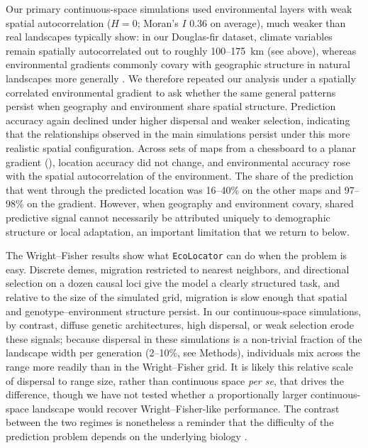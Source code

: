 \documentclass[]{article}
\newcommand{\dfir}{Douglas-fir\xspace}
\newcommand{\ecolocator}{\texttt{EcoLocator}\xspace}
\begin{document}
Our primary continuous-space simulations used environmental layers
with weak spatial autocorrelation
($H=0$; Moran's $I$ 0.36 on average),
much weaker than real landscapes typically show: in our \dfir dataset, climate variables remain spatially
autocorrelated out to roughly 100--175~km (see above), whereas environmental
gradients commonly covary with geographic structure in natural landscapes
more generally \citep{meirmans_ibd_2012}.
We therefore repeated our analysis under a spatially correlated
environmental gradient to ask whether the same general patterns
persist when geography and environment share spatial structure.
Prediction accuracy again declined under higher dispersal
and weaker selection, indicating that the relationships observed
in the main simulations persist under this more realistic
spatial configuration.
Across sets of maps from a chessboard to a planar gradient
(),
location accuracy did not change,
and environmental accuracy rose with the spatial autocorrelation
of the environment.
The share of the prediction that went through the predicted location
was 16--40\% on the other maps and 97--98\% on the gradient.
However, when geography and environment covary,
shared predictive signal cannot necessarily be attributed uniquely
to demographic structure or local adaptation,
an important limitation that we return to below.

The Wright--Fisher results show what \ecolocator can do
when the problem is easy. Discrete demes, migration restricted to
nearest neighbors, and directional selection on a dozen causal loci
give the model a clearly structured task, and relative to the size of
the simulated grid, migration is slow enough that spatial and
genotype--environment structure persist. In our continuous-space
simulations, by contrast, diffuse genetic architectures, high
dispersal, or weak selection erode these signals; because dispersal in these
simulations is a non-trivial fraction of the landscape width per
generation (2--10\%, see Methods), individuals mix across the range
more readily than in the Wright--Fisher grid. It is likely this relative scale of
dispersal to range size, rather than continuous space \textit{per se},
that drives the difference, though we have not tested whether a
proportionally larger continuous-space landscape would recover
Wright--Fisher-like performance. The contrast between the two regimes
is nonetheless a reminder that the difficulty of the prediction
problem depends on the underlying biology \citep{booker_wza_2024, dauphin_rethinking_2023}.
\end{document}
